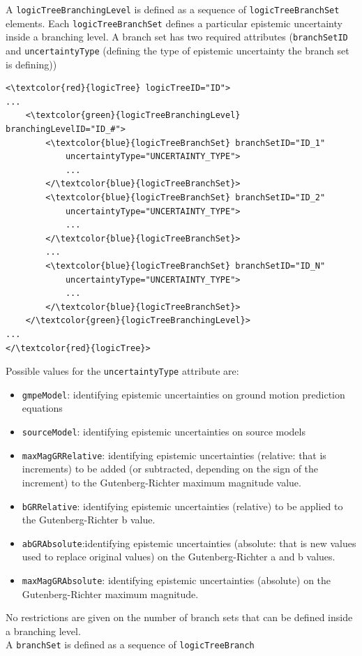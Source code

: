 A \Verb+logicTreeBranchingLevel+ is defined as a sequence of 
\Verb+logicTreeBranchSet+ elements. Each \Verb+logicTreeBranchSet+ 
defines a particular epistemic uncertainty inside a branching level. 
A branch set has two required attributes (\Verb+branchSetID+ and 
\Verb+uncertaintyType+ (defining the type of epistemic uncertainty 
the branch set is defining))
\begin{Verbatim}[frame=single, commandchars=\\\{\}]
<\textcolor{red}{logicTree} logicTreeID="ID">
...
	<\textcolor{green}{logicTreeBranchingLevel} branchingLevelID="ID_#">
		<\textcolor{blue}{logicTreeBranchSet} branchSetID="ID_1"
			uncertaintyType="UNCERTAINTY_TYPE">
			...
		</\textcolor{blue}{logicTreeBranchSet}>
		<\textcolor{blue}{logicTreeBranchSet} branchSetID="ID_2"
			uncertaintyType="UNCERTAINTY_TYPE">
			...
		</\textcolor{blue}{logicTreeBranchSet}>
		...
		<\textcolor{blue}{logicTreeBranchSet} branchSetID="ID_N"
			uncertaintyType="UNCERTAINTY_TYPE">
			...
		</\textcolor{blue}{logicTreeBranchSet}>
	</\textcolor{green}{logicTreeBranchingLevel}>
...
</\textcolor{red}{logicTree}>
\end{Verbatim}
Possible values for the \Verb+uncertaintyType+ attribute are:
\begin{itemize}
\item \Verb+gmpeModel+: identifying epistemic uncertainties on ground 
motion prediction equations
\item \Verb+sourceModel+: identifying epistemic uncertainties on source models
\item \Verb+maxMagGRRelative+: identifying epistemic uncertainties 
(relative: that is increments) to be added (or subtracted, depending on 
the sign of the increment) to the 
Guten\-berg-Richter maximum magnitude value.
\item \Verb+bGRRelative+: identifying epistemic uncertainties (relative)
to be applied to the Guten\-berg-Richter b value.
\item \Verb+abGRAbsolute+:identifying epistemic uncertainties (absolute: 
that is new values used to replace original values) on the Guten\-berg-Richter
a and b values.
\item \Verb+maxMagGRAbsolute+: identifying epistemic uncertainties 
(absolute) on the Guten\-berg-Richter maximum magnitude.
\end{itemize}
No restrictions are given on the number of branch sets that can be defined 
inside a branching level.\\
A \Verb+branchSet+ is defined as a sequence of  \Verb+logicTreeBranch+ 
